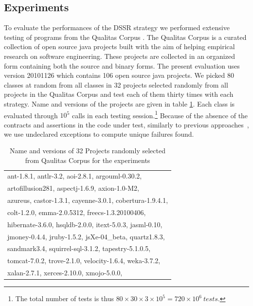 \documentclass[conference]{IEEEtran}
\begin{document}
\subsection{Experiments}

To evaluate the performances of the DSSR strategy we performed extensive testing of programs from the Qualitas Corpus \cite{Tempero2010a}. The Qualitas Corpus is a curated collection of open source java projects built with the aim of helping empirical research on  software engineering. These projects are collected in an organized form containing both the source and binary forms. The present evaluation uses version 20101126 which contains 106 open source java projects. We picked 80 classes at random from all classes in 32 projects selected randomly from all projects in the Qualitas Corpus and test each of them thirty times with each strategy. Name and versions of the projects are given in table \ref{table:projects}.
Each class is evaluated through $10^5$ calls in each testing session.\footnote{The total number of tests is thus $80\times 30\times 3 \times 10^5 = 720\times 10^6~tests$.} 
Because of the absence of the contracts and assertions in the code under test, similarly to previous approaches~\cite{Oriol2012}, we use undeclared exceptions to compute unique failures found.


\begin{table}[H]
\scriptsize
\caption{ Name and versions of 32 Projects randomly selected from Qaulitas Corpus for the experiments}
\centering
\begin{tabular}{|l|}
\hline
ant-1.8.1,
antlr-3.2,
aoi-2.8.1,
argouml-0.30.2,\\*
artofillusion281,
aspectj-1.6.9,
axion-1.0-M2,\\*
azureus,
castor-1.3.1,
cayenne-3.0.1,
cobertura-1.9.4.1,\\*
colt-1.2.0,
emma-2.0.5312,
freecs-1.3.20100406,\\*
hibernate-3.6.0,
hsqldb-2.0.0,
itext-5.0.3,
jasml-0.10,\\*
jmoney-0.4.4,
jruby-1.5.2,
jsXe-04\_beta,
quartz1.8.3,\\*
sandmark3.4,
squirrel-sql-3.1.2,
tapestry-5.1.0.5,\\*
tomcat-7.0.2,
trove-2.1.0,
velocity-1.6.4,
weka-3.7.2,\\*
xalan-2.7.1,
xerces-2.10.0,
xmojo-5.0.0, \\
\hline

\end{tabular}
\label{table:projects}
\end{table}
\end{document}
